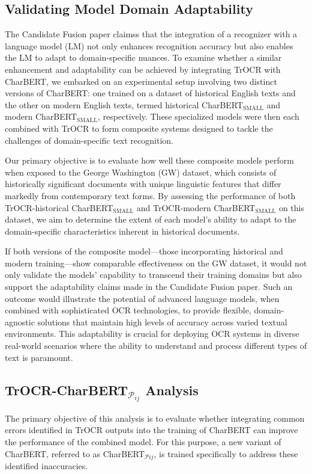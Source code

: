 \subsection{Validating Model Domain Adaptability}
\label{subsec:5_validating_model_domain_adaptability}
The Candidate Fusion paper claimss that the integration of a recognizer with a language model (LM) not only enhances recognition accuracy but also enables the LM to adapt to domain-specific nuances. To examine whether a similar enhancement and adaptability can be achieved by integrating TrOCR with CharBERT, we embarked on an experimental setup involving two distinct versions of CharBERT: one trained on a dataset of historical English texts and the other on modern English texts, termed historical CharBERT$_{\text{SMALL}}$ and modern CharBERT$_{\text{SMALL}}$, respectively. These specialized models were then each combined with TrOCR to form composite systems designed to tackle the challenges of domain-specific text recognition.

Our primary objective is to evaluate how well these composite models perform when exposed to the George Washington (GW) dataset, which consists of historically significant documents with unique linguistic features that differ markedly from contemporary text forms. By assessing the performance of both TrOCR-historical CharBERT$_{\text{SMALL}}$ and TrOCR-modern CharBERT$_{\text{SMALL}}$ on this dataset, we aim to determine the extent of each model's ability to adapt to the domain-specific characteristics inherent in historical documents.

If both versions of the composite model—those incorporating historical and modern training—show comparable effectiveness on the GW dataset, it would not only validate the models' capability to transcend their training domains but also support the adaptability claims made in the Candidate Fusion paper. Such an outcome would illustrate the potential of advanced language models, when combined with sophisticated OCR technologies, to provide flexible, domain-agnostic solutions that maintain high levels of accuracy across varied textual environments. This adaptability is crucial for deploying OCR systems in diverse real-world scenarios where the ability to understand and process different types of text is paramount.

\subsection{TrOCR-CharBERT$_{\mathcal{P}_{ij}}$ Analysis}
\label{subsec:5_trocr_charbert_pij_analysis}
The primary objective of this analysis is to evaluate whether integrating common errors identified in TrOCR outputs into the training of CharBERT can improve the performance of the combined model. For this purpose, a new variant of CharBERT, referred to as CharBERT$_{\mathcal{P}{ij}}$, is trained specifically to address these identified inaccuracies.

